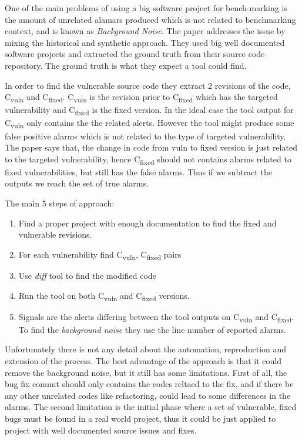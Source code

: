 \documentclass[authoryear,preprint]{sigplanconf}
\begin{document}
One of the main problems of using a big software project for bench-marking is the amount of unrelated alamars produced which is not related to benchmarking context, and is known as \textit{Background Noise}. The paper addresses the issue by mixing the historical and synthetic approach. They used big well documented software projects and extracted the ground truth from their source code repository. The ground truth is what they expect a tool could find.

In order to find the vulnerable source code they extract 2 revisions of the code, C\textsubscript{vuln} and C\textsubscript{fixed}. C\textsubscript{vuln} is the revision prior to C\textsubscript{fixed} which has the targeted vulnerability and C\textsubscript{fixed} is the fixed version. In the ideal case the tool output for C\textsubscript{vuln} only contains the the related alerts. However the tool might produce some false positive alarms which is not related to the type of targeted vulnerability. The paper says that, the change in code from vuln to fixed version is just related to the targeted vulnerability, hence C\textsubscript{fixed} should not contains alarms related to fixed vulnerabilities, but still has the false alarms. Thus if we subtract the outputs we reach the set of true alarms. 

The main 5 steps of approach: 
\begin{enumerate}
	\item Find a proper project with enough documentation to find the fixed and vulnerable revisions. 
	\item For each vulnerability find  C\textsubscript{vuln},  C\textsubscript{fixed} pairs
	\item Use \textit{diff} tool to find the modified code
	\item Run the tool on both C\textsubscript{vuln} and C\textsubscript{fixed} versions.
	\item Signals are the alerts differing between the tool outputs on C\textsubscript{vuln} and C\textsubscript{fixed}. To find the \textit{background noise} they use the line number of reported alarms. 
\end{enumerate}

Unfortunately there is not any detail about the automation, reproduction and extension of the process. The best advantage of the approach is that it could remove the background noise, but it still has some limitations. First of all, the bug fix commit should only contains the codes reltaed to the fix, and if there be any other unrelated codes like refactoring, could lead to some differences in the alarms. The second limitation is the initial phase where a set of vulnerable, fixed bugs must be found in a real world project, thus it could be just applied to project with well documented source issues and fixes.
\end{document}
